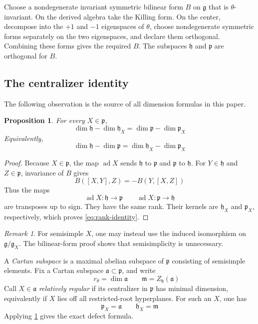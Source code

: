 \documentclass[11pt]{amsart}
\newtheorem{proposition}[proposition]{Proposition}
\theoremstyle{definition}
\theoremstyle{remark}
\newtheorem{remark}[remark]{Remark}
\newcommand{\ad}{\operatorname{ad}}
\newcommand{\g}{\mathfrak g}
\newcommand{\h}{\mathfrak h}
\newcommand{\p}{\mathfrak p}
\newcommand{\aA}{\mathfrak a}
\newcommand{\mM}{\mathfrak m}
\begin{document}
Choose a nondegenerate invariant symmetric bilinear form
$B$ on $\g$ that is $\theta$-invariant.  On the derived algebra take the
Killing form.  On the center, decompose into the $+1$ and $-1$ eigenspaces of
$\theta$, choose nondegenerate symmetric forms separately on the two
eigenspaces, and declare them orthogonal.  Combining these forms gives the
required $B$.  The subspaces $\h$ and $\p$ are orthogonal for $B$.

\subsection{The centralizer identity}
The following observation is the source of all dimension formulas in this
paper.

\begin{proposition}\label{prop:rank-identity}
For every $X\in\p$,
\begin{equation}\label{eq:rank-identity}
 \dim\h-\dim\h_X=\dim\p-\dim\p_X
\end{equation}
Equivalently,
\begin{equation}\label{eq:centralizer-difference}
 \dim\h-\dim\p=\dim\h_X-\dim\p_X
\end{equation}
\end{proposition}

\begin{proof}
Because $X\in\p$, the map $\ad X$ sends $\h$ to $\p$ and $\p$ to $\h$.
For $Y\in\h$ and $Z\in\p$, invariance of $B$ gives
\[
 B([X,Y],Z)=-B(Y,[X,Z])
\]
Thus the maps
\[
 \ad X:\h\longrightarrow\p
 \qquad
 \ad X:\p\longrightarrow\h
\]
are transposes up to sign.  They have the same rank.  Their kernels are
$\h_X$ and $\p_X$, respectively, which proves \eqref{eq:rank-identity}.
\end{proof}

\begin{remark}
For semisimple $X$, one may instead use the induced isomorphism on
$\g/\g_X$.  The bilinear-form proof shows that semisimplicity is unnecessary.
\end{remark}

A \emph{Cartan subspace} is a maximal abelian subspace of $\p$ consisting of
semisimple elements.  Fix a Cartan subspace $\aA\subset\p$, and write
\[
 \qquad r_\theta=\dim\aA
 \qquad \mM=Z_\h(\aA)
\]
Call $X\in\aA$ \emph{relatively regular} if its centralizer in $\p$ has
minimal dimension, equivalently if $X$ lies off all restricted-root
hyperplanes.  For such an $X$, one has
\[
 \p_X=\aA
 \qquad \h_X=\mM
\]
Applying \cref{prop:rank-identity} gives the exact defect formula.
\end{document}
